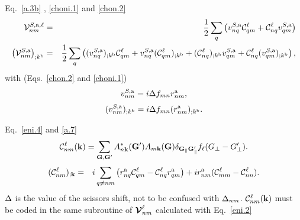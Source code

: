 Eq.~\eqref{a.3b} , \eqref{choni.1} and \eqref{chon.2}
\begin{eqnarray}\label{c-a.3b}
{\mathbf{\cal V}}^{S,\mathrm{a},\ell}_{nm}
&=&
\frac{1}{2}\sum_q\left( 
v^{S,\mathrm{a}}_{nq}{\mathbf{\cal C}}^\ell_{qm}+{\mathbf{\cal C}}^\ell_{nq} v^{S,\mathrm{a}}_{qm}
\right)
\nonumber\\
\left({\mathbf{\cal V}}^{S,\mathrm{a}}_{nm}\right)_{;k^{\mathrm{b}}}
&=&
\frac{1}{2}\sum_q\left(
(v^{S,\mathrm{a}}_{nq})_{;k^{\mathrm{b}}}{\mathbf{\cal C}}^\ell_{qm}
+  
v^{S,\mathrm{a}}_{nq}({\mathbf{\cal C}}^\ell_{qm})_{;k^{\mathrm{b}}}
+
({\mathbf{\cal C}}^\ell_{nq})_{;k^{\mathrm{b}}} v^{S,\mathrm{a}}_{qm}
+
{\mathbf{\cal C}}^\ell_{nq} (v^{S,\mathrm{a}}_{qm})_{;k^{\mathrm{b}}}
\right)
,
\end{eqnarray}  
with (Eqs.~\eqref{chon.2} and \eqref{choni.1})
\begin{eqnarray}\label{c-chon.2} 
v^{S,\mathrm{a}}_{nm}=i\Delta f_{mn}r^{\mathrm{a}}_{nm}
,
\end{eqnarray}
\begin{eqnarray}\label{c-choni.1}
(v^{S,\mathrm{a}}_{nm})_{;k^{\mathrm{b}}}=i\Delta f_{mn}
(r^{\mathrm{a}}_{nm})_{;k^{\mathrm{b}}}
.
\end{eqnarray}

Eq.~\eqref{eni.4} and \eqref{a.7}
\begin{eqnarray}\label{c-eni.4}
{\mathbf{\cal C}}^\ell_{nm}(\mathbf{k})=
\sum_{\mathbf{G},\mathbf{G}'} A^*_{n\mathbf{k}}(\mathbf{G}')  A_{m\mathbf{k}}(\mathbf{G})
\delta_{\mathbf{G}_\parallel \mathbf{G}'_\parallel}
f_\ell(G_\perp-G'_\perp)
.
\end{eqnarray} 
\begin{eqnarray}\label{c-a.7}
 ({\mathbf{\cal C}}^\ell_{nm})_{;\mathbf{k}}
&=&
i\sum_{q\ne nm}
\left(
r_{nq}^{\mathrm{a}}
{\mathbf{\cal C}}^\ell_{qm}
-
{\mathbf{\cal C}}^\ell_{nq}
r_{qm}^{\mathrm{a}}
\right)
+ir_{nm}^{\mathrm{a}}({\mathbf{\cal C}}^\ell_{mm}-{\mathbf{\cal C}}^\ell_{nn})
.
\end{eqnarray} 
$\Delta$ is the value of the scissors shift, not to be confused with $\Delta_{nm}$. 
${\mathbf{\cal C}}^\ell_{nm}(\mathbf{k})$ must be coded in the same subroutine of $\boldsymbol{\mathcal{\cal V}}^\ell_{nm}$
 calculated with Eq.~\eqref{eni.2}
